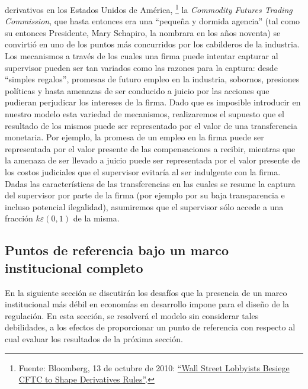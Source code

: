 \documentclass[
  12pt,
  spanish,
]{book}
\begin{document}
\begin{enumerate}
  derivativos en los Estados Unidos de América, \footnote{Fuente:
    Bloomberg, 13 de octubre de 2010:
    \href{http://www.bloomberg.com/news/articles/2010-10-14/wall-street-lobbyists-besiege-cftc-to-influence-regulations-on-derivatives}{``Wall
    Street Lobbyists Besiege CFTC to Shape Derivatives Rules''}.} la
  \emph{Commodity Futures Trading Commission}, que hasta entonces era
  una ``pequeña y dormida agencia'' (tal como su entonces Presidente,
  Mary Schapiro, la nombrara en los años noventa) se convirtió en uno de
  los puntos más concurridos por los cabilderos de la industria. Los
  mecanismos a través de los cuales una firma puede intentar capturar al
  supervisor pueden ser tan variados como las razones para la captura:
  desde ``simples regalos'', promesas de futuro empleo en la industria,
  sobornos, presiones políticas y hasta amenazas de ser conducido a
  juicio por las acciones que pudieran perjudicar los intereses de la
  firma. Dado que es imposible introducir en nuestro modelo esta
  variedad de mecanismos, realizaremos el supuesto que el resultado de
  los mismos puede ser representado por el valor de una transferencia
  monetaria. Por ejemplo, la promesa de un empleo en la firma puede ser
  representada por el valor presente de las compensaciones a recibir,
  mientras que la amenaza de ser llevado a juicio puede ser representada
  por el valor presente de los costos judiciales que el supervisor
  evitaría al ser indulgente con la firma. Dadas las características de
  las transferencias en las cuales se resume la captura del supervisor
  por parte de la firma (por ejemplo por su baja transparencia e incluso
  potencial ilegalidad), asumiremos que el supervisor sólo accede a una
  fracción \(k ε (0,1)\) de la misma.
\end{enumerate}

\hypertarget{puntos-de-referencia-bajo-un-marco-institucional-completo}{%
\subsection{Puntos de referencia bajo un marco institucional
completo}\label{puntos-de-referencia-bajo-un-marco-institucional-completo}}

En la siguiente sección se discutirán los desafíos que la presencia de
un marco institucional más débil en economías en desarrollo impone para
el diseño de la regulación. En esta sección, se resolverá el modelo sin
considerar tales debilidades, a los efectos de proporcionar un punto de
referencia con respecto al cual evaluar los resultados de la próxima
sección.
\end{document}
